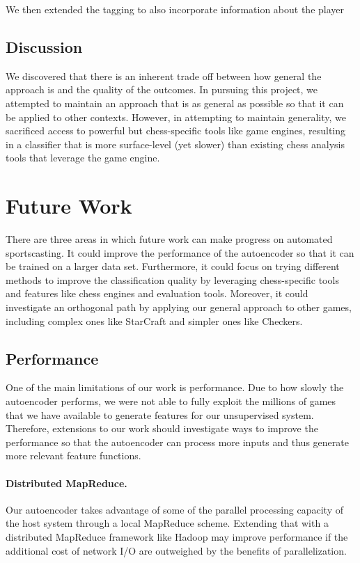 \documentclass[11pt]{article}
\begin{document}
We then extended the tagging to also incorporate information about the player

\subsection{Discussion}
We discovered that there is an inherent trade off between how general the approach is and the quality of the outcomes. In pursuing this project, we attempted to maintain an approach that is as general as possible so that it can be applied to other contexts. However, in attempting to maintain generality, we sacrificed access to powerful but chess-specific tools like game engines, resulting in a classifier that is more surface-level (yet slower) than existing chess analysis tools that leverage the game engine. 

\section{Future Work}
There are three areas in which future work can make progress on automated sportscasting. It could improve the performance of the autoencoder so that it can be trained on a larger data set. Furthermore, it could focus on trying different methods to improve the classification quality by leveraging chess-specific tools and features like chess engines and evaluation tools. Moreover, it could investigate an orthogonal path by applying our general approach to other games, including complex ones like StarCraft and simpler ones like Checkers.

\subsection{Performance}
One of the main limitations of our work is performance. Due to how slowly the autoencoder performs, we were not able to fully exploit the millions of games that we have available to generate features for our unsupervised system. Therefore, extensions to our work should investigate ways to improve the performance so that the autoencoder can process more inputs and thus generate more relevant feature functions.

\paragraph{Distributed MapReduce.}
Our autoencoder takes advantage of some of the parallel processing capacity of the host system through a local MapReduce scheme. Extending that with a distributed MapReduce framework like Hadoop may improve performance if the additional cost of network I/O are outweighed by the benefits of parallelization.
\end{document}
